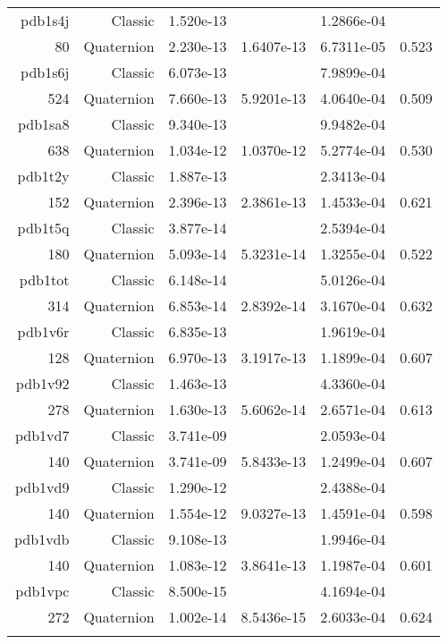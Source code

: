 \begin{xltabular}{\textwidth}{r|rS[table-format=1.3e+2]S[table-format=1.4e+2]S[table-format=1.4e+2]S[table-format=-1.3]}
pdb1s4j & Classic & 1.520e-13 &  & 1.2866e-04 & \\
80 & Quaternion & 2.230e-13 & 1.6407e-13 & 6.7311e-05 & 0.523\\  \addlinespace
pdb1s6j & Classic & 6.073e-13 &  & 7.9899e-04 & \\
524 & Quaternion & 7.660e-13 & 5.9201e-13 & 4.0640e-04 & 0.509\\  \addlinespace
pdb1sa8 & Classic & 9.340e-13 &  & 9.9482e-04 & \\
638 & Quaternion & 1.034e-12 & 1.0370e-12 & 5.2774e-04 & 0.530\\  \addlinespace
pdb1t2y & Classic & 1.887e-13 &  & 2.3413e-04 & \\
152 & Quaternion & 2.396e-13 & 2.3861e-13 & 1.4533e-04 & 0.621\\  \addlinespace
pdb1t5q & Classic & 3.877e-14 &  & 2.5394e-04 & \\
180 & Quaternion & 5.093e-14 & 5.3231e-14 & 1.3255e-04 & 0.522\\  \addlinespace
pdb1tot & Classic & 6.148e-14 &  & 5.0126e-04 & \\
314 & Quaternion & 6.853e-14 & 2.8392e-14 & 3.1670e-04 & 0.632\\  \addlinespace
pdb1v6r & Classic & 6.835e-13 &  & 1.9619e-04 & \\
128 & Quaternion & 6.970e-13 & 3.1917e-13 & 1.1899e-04 & 0.607\\  \addlinespace
pdb1v92 & Classic & 1.463e-13 &  & 4.3360e-04 & \\
278 & Quaternion & 1.630e-13 & 5.6062e-14 & 2.6571e-04 & 0.613\\  \addlinespace
pdb1vd7 & Classic & 3.741e-09 &  & 2.0593e-04 & \\
140 & Quaternion & 3.741e-09 & 5.8433e-13 & 1.2499e-04 & 0.607\\  \addlinespace
pdb1vd9 & Classic & 1.290e-12 &  & 2.4388e-04 & \\
140 & Quaternion & 1.554e-12 & 9.0327e-13 & 1.4591e-04 & 0.598\\  \addlinespace
pdb1vdb & Classic & 9.108e-13 &  & 1.9946e-04 & \\
140 & Quaternion & 1.083e-12 & 3.8641e-13 & 1.1987e-04 & 0.601\\  \addlinespace
pdb1vpc & Classic & 8.500e-15 &  & 4.1694e-04 & \\
272 & Quaternion & 1.002e-14 & 8.5436e-15 & 2.6033e-04 & 0.624\\  \addlinespace

\end{xltabular}
